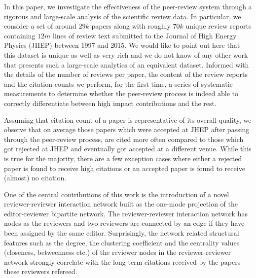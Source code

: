 In this paper, we investigate the effectiveness of the peer-review system through a rigorous and large-scale analysis of the scientific review data. In particular, we consider a set of around $29k$ papers along with roughly $70k$ unique review reports containing $12m$ lines of review text submitted to the Journal of High Energy Physics (JHEP) between 1997 and 2015. We would like to point out here that this dataset is unique as well as very rich and we do not know of any other work that presents such a large-scale analytics of an equivalent dataset. Informed with the details of the number of reviews per paper, the content of the review reports and the citation counts we perform, for the first time, a series of systematic measurements to determine whether the peer-review process is indeed able to correctly differentiate between high impact contributions and the rest.

  Assuming that citation count of a paper is representative of its overall quality, we observe that on average those papers which were accepted at JHEP after passing through the peer-review process, are cited more often compared to those which got rejected at JHEP and eventually got accepted at a different venue. While this is true for the majority, there are a few exception cases where either a rejected paper is found to receive high citations or an accepted paper is found to receive (almost) no citation. 

 One of the central contributions of this work is the introduction of a novel reviewer-reviewer interaction network built as the one-mode projection of the editor-reviewer bipartite network. The reviewer-reviewer interaction network has nodes as the reviewers and two reviewers are connected by an edge if they have been assigned by the same editor. Surprisingly, the network related structural features such as the degree, the clustering coefficient and the centrality values (closeness, betweenness etc.) of the reviewer nodes in the reviewer-reviewer network strongly correlate with the  long-term citations received by the papers these reviewers refereed. 

